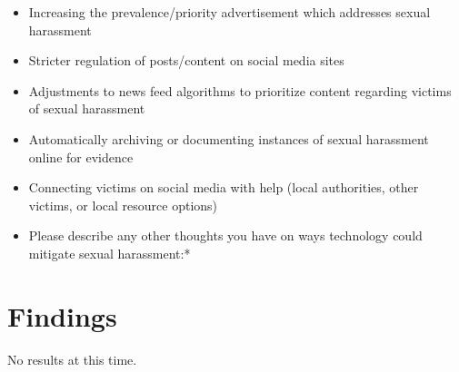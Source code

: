 \begin{adjustwidth}{0cm}{}
\begin{itemize}
         \begin{itemize}
            \item Increasing the prevalence/priority advertisement which addresses sexual harassment
            \item Stricter regulation of posts/content on social media sites
            \item Adjustments to news feed algorithms to prioritize content regarding victims of sexual harassment
            \item Automatically archiving or documenting instances of sexual harassment online for evidence
            \item Connecting victims on social media with help (local authorities, other victims, or local resource options)
            \item Please describe any other thoughts you have on ways technology could mitigate sexual harassment:*
        \end{itemize}

    \end{itemize}
\end{adjustwidth}

\section{Findings}

No results at this time.
